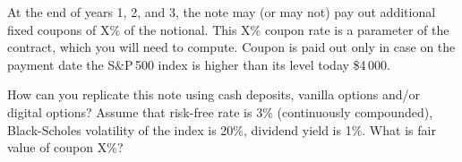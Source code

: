 \documentclass[a4paper,14pt]{extarticle}
\begin{document}
At the end of years 1, 2, and 3, the note may (or may not) pay out additional fixed coupons of X\%
of the notional. This X\% coupon rate is a parameter of the contract, which you will need to compute.
Coupon is paid out only in case on the payment date the S\&P\,500 index is higher than its level
today \$4\,000.

How can you replicate this note using cash deposits, vanilla options and/or digital options?
Assume that risk-free rate is 3\% (continuously compounded), Black-Scholes volatility of the
index is 20\%, dividend yield is 1\%. What is fair value of coupon X\%?
\end{document}
